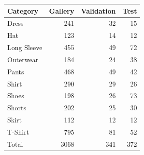 \begin{tabular}{@{}lrrr@{}}
\toprule
\textbf{Category} & \textbf{Gallery} & \textbf{Validation} & \textbf{Test} \\ \midrule
Dress & 241 & 32 & 15 \\
Hat & 123 & 14 & 12 \\
Long Sleeve & 455 & 49 & 72 \\
Outerwear & 184 & 24 & 38 \\
Pants & 468 & 49 & 42 \\
Shirt & 290 & 29 & 26 \\
Shoes & 198 & 26 & 73 \\
Shorts & 202 & 25 & 30 \\
Skirt & 112 & 12 & 12 \\
T-Shirt & 795 & 81 & 52 \\
Total & 3068 & 341 & 372 \\
\bottomrule
\end{tabular}
